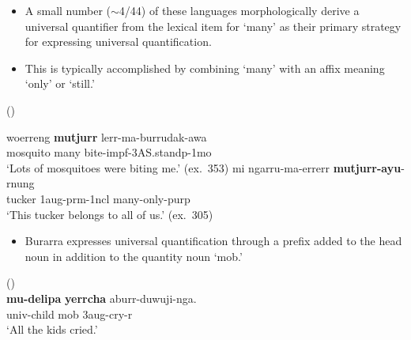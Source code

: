 \documentclass{article}
\begin{document}
\begin{itemize}
\item A small number ($\sim$4/44) of these languages morphologically derive a universal quantifier from the lexical item for `many' as their primary strategy for expressing universal quantification.
\item This is typically accomplished by combining `many' with an affix meaning `only' or `still.'
\end{itemize}
\begin{exe}
   (\citealt{zandvoort99})
  \begin{xlist}
    \ex \gll woerreng \textbf{mutjurr} lerr-ma-burrudak-awa\\
    mosquito many bite-{\sc impf}-3AS.stand{\sc p}-1{\sc mo}\\
    \glt `Lots of mosquitoes were biting me.' (ex.~353) %
    \ex \gll mi ngarru-ma-errerr \textbf{mutjurr-ayu}-rnung\\
    tucker 1{\sc aug-prm}-1{\sc ncl} many-only-{\sc purp}\\
    \glt `This tucker belongs to all of us.' (ex.~305) %
  \end{xlist}
\end{exe}

\begin{itemize}
\item Burarra expresses universal quantification through a prefix added to the head noun in addition to the quantity noun `mob.'
\end{itemize}
\begin{exe}
   (\citealt[34]{green87}) \\
  \gll \textbf{mu-delipa}     \textbf{yerrcha}     aburr-duwuji-nga.\\
  {\sc univ}-child    mob        3{\sc aug}-cry-{\sc r}\\
  \glt `All the kids cried.'
\end{exe}
\end{document}

